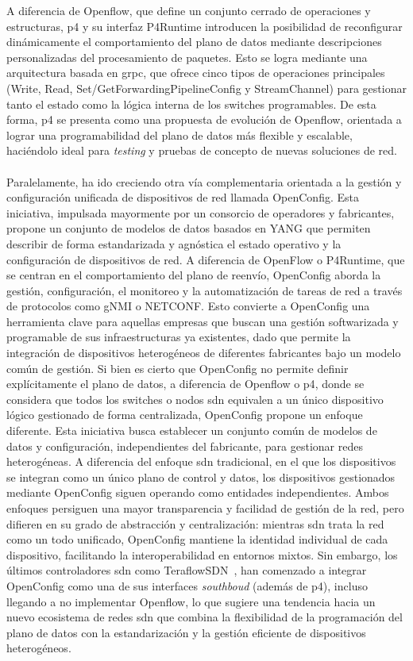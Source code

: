 A diferencia de Openflow, que define un conjunto cerrado de operaciones y estructuras, \gls{p4} y su interfaz P4Runtime introducen la posibilidad de reconfigurar dinámicamente el comportamiento del plano de datos mediante descripciones personalizadas del procesamiento de paquetes. Esto se logra mediante una arquitectura basada en \gls{grpc}, que ofrece cinco tipos de operaciones principales (Write, Read, Set/GetForwardingPipelineConfig y StreamChannel) para gestionar tanto el estado como la lógica interna de los switches programables. De esta forma, \gls{p4} se presenta como una propuesta de evolución de Openflow, orientada a lograr una programabilidad del plano de datos más flexible y escalable, haciéndolo ideal para \textit{testing} y pruebas de concepto de nuevas soluciones de red.\\
\\
Paralelamente, ha ido creciendo otra vía complementaria orientada a la gestión y configuración unificada de dispositivos de red llamada OpenConfig. Esta iniciativa, impulsada mayormente por un consorcio de operadores y fabricantes, propone un conjunto de modelos de datos basados en YANG que permiten describir de forma estandarizada y agnóstica el estado operativo y la configuración de dispositivos de red. A diferencia de OpenFlow o P4Runtime, que se centran en el comportamiento del plano de reenvío, OpenConfig aborda la gestión, configuración, el monitoreo y la automatización de tareas de red a través de protocolos como gNMI o NETCONF. Esto convierte a OpenConfig una herramienta clave para aquellas empresas que buscan una gestión softwarizada y programable de sus infraestructuras ya existentes, dado que permite la integración de dispositivos heterogéneos de diferentes fabricantes bajo un modelo común de gestión. Si bien es cierto que OpenConfig no permite definir explícitamente el plano de datos, a diferencia de Openflow o \gls{p4}, donde se considera que todos los switches o nodos \gls{sdn} equivalen a un único dispositivo lógico gestionado de forma centralizada, OpenConfig propone un enfoque diferente. Esta iniciativa busca establecer un conjunto común de modelos de datos y configuración, independientes del fabricante, para gestionar redes heterogéneas. A diferencia del enfoque \gls{sdn} tradicional, en el que los dispositivos se integran como un único plano de control y datos, los dispositivos gestionados mediante OpenConfig siguen operando como entidades independientes. Ambos enfoques persiguen una mayor transparencia y facilidad de gestión de la red, pero difieren en su grado de abstracción y centralización: mientras \gls{sdn} trata la red como un todo unificado, OpenConfig mantiene la identidad individual de cada dispositivo, facilitando la interoperabilidad en entornos mixtos. Sin embargo, los últimos controladores \gls{sdn} como TeraflowSDN~\cite{teraflowsdn2021}, han comenzado a integrar OpenConfig como una de sus interfaces \textit{southboud} (además de \gls{p4}), incluso llegando a no implementar Openflow, lo que sugiere una tendencia hacia un nuevo ecosistema de redes \gls{sdn} que combina la flexibilidad de la programación del plano de datos con la estandarización y la gestión eficiente de dispositivos heterogéneos.\\
